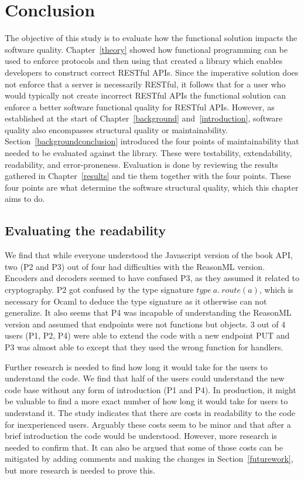 \chapter{Conclusion}\label{conclusion}

 The objective of this study is to evaluate how the functional solution impacts
 the software quality. Chapter~\ref{theory} showed how functional programming
 can be used to enforce protocols and then using that created a library which
 enables developers to construct correct RESTful APIs. Since the imperative
 solution does not enforce that a server is necessarily RESTful, it follows that
 for a user who would typically not create incorrect RESTful APIs the functional
 solution can enforce a better software functional quality for RESTful APIs.
 However, as established at the start of Chapter~\ref{background}
 and~\ref{introduction}, software quality also encompasses structural quality or
 maintainability. Section~\ref{backgroundconclusion} introduced the four points
 of maintainability that needed to be evaluated against the library.  These were
 testability, extendability, readability, and error-proneness.  Evaluation is
 done by reviewing the results gathered in Chapter~\ref{results} and tie them
 together with the four points. These four points are what determine the
 software structural quality, which this chapter aims to do.

\section{Evaluating the readability}

We find that while everyone understood the Javascript version of the book API,
two (P2 and P3) out of four had difficulties with the ReasonML version.
Encoders and decoders seemed to have confused P3, as they assumed it related to
cryptography. P2 got confused by the type signature $type\ a.\ route(a)$, which
is necessary for Ocaml to deduce the type signature as it otherwise can not
generalize. It also seems that P4 was incapable of understanding the ReasonML
version and assumed that endpoints were not functions but objects.  3 out of 4
users (P1, P2, P4) were able to extend the code with a new endpoint PUT and P3
was almost able to except that they used the wrong function for handlers.

Further research is needed to find how long it would take for the users to
understand the code. We find that half of the users could understand the new
code base without any form of introduction (P1 and P4). In production, it might
be valuable to find a more exact number of how long it would take for users to
understand it.  The study indicates that there are costs in readability to the
code for inexperienced users. Arguably these costs seem to be minor and that
after a brief introduction the code would be understood. However, more research
is needed to confirm that. It can also be argued that some of those costs can be
mitigated by adding comments and making the changes in Section~\ref{futurework},
but more research is needed to prove this.



